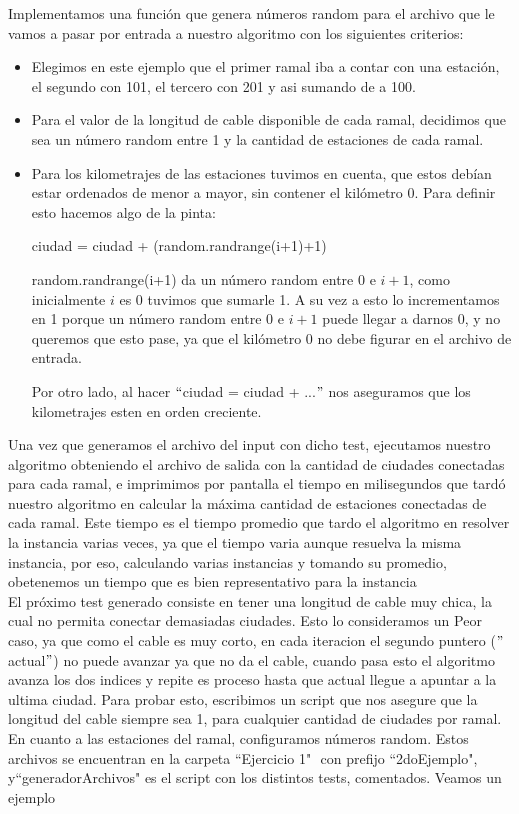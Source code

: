 Implementamos una función que genera números random para el archivo que le vamos a pasar por entrada a nuestro algoritmo con los siguientes criterios:
\begin{itemize}
\item Elegimos en este ejemplo que el primer ramal iba a contar con una estación, el segundo con 101, el tercero con 201 y asi sumando de a 100.
\item Para el valor de la longitud de cable disponible de cada ramal, decidimos que sea un número random entre 1 y la cantidad de estaciones de cada ramal.
\item Para los kilometrajes de las estaciones tuvimos en cuenta, que estos debían estar ordenados de menor a mayor, sin contener el kilómetro 0. Para definir esto hacemos algo de la pinta:

ciudad = ciudad + (random.randrange(i+1)+1)

random.randrange(i+1) da un número random entre 0 e $i+1$, como inicialmente $i$ es 0 tuvimos que sumarle 1. A su vez a esto lo incrementamos en 1 porque un número random entre 0 e $i+1$ puede llegar a darnos 0, y no queremos que esto pase, ya que el kilómetro 0 no debe figurar en el archivo de entrada.

Por otro lado, al hacer $``$ciudad = ciudad + ...$"$ nos aseguramos que los kilometrajes esten en orden creciente.

\end{itemize}

Una vez que generamos el archivo del input con dicho test, ejecutamos nuestro algoritmo obteniendo el archivo de salida con la cantidad de ciudades conectadas para cada ramal, e imprimimos por pantalla el tiempo en milisegundos que tardó nuestro algoritmo en calcular la máxima cantidad de estaciones conectadas de cada ramal. Este tiempo es el tiempo promedio que tardo el algoritmo en resolver la instancia varias veces, ya que el tiempo varia aunque resuelva la misma instancia, por eso, calculando varias instancias y tomando su promedio, obetenemos un tiempo que es bien representativo para la instancia  \\


El próximo test generado consiste en tener una longitud de cable muy chica, la cual no permita conectar demasiadas ciudades. Esto lo consideramos un Peor caso, ya que como el cable es muy corto, en cada iteracion el segundo puntero ($"$actual$"$) no puede avanzar ya que no da el cable, cuando pasa esto el algoritmo avanza los dos indices y repite es proceso hasta que actual llegue a apuntar a la ultima ciudad.  Para probar esto, escribimos un script que nos asegure que la longitud del cable siempre sea 1, para cualquier cantidad de ciudades por ramal. En cuanto a las estaciones del ramal, configuramos números random. Estos archivos se encuentran en la carpeta ``Ejercicio 1" $ $ con prefijo ``2doEjemplo", y``generadorArchivos" $ $es el script con los distintos tests, comentados. Veamos un ejemplo\\

